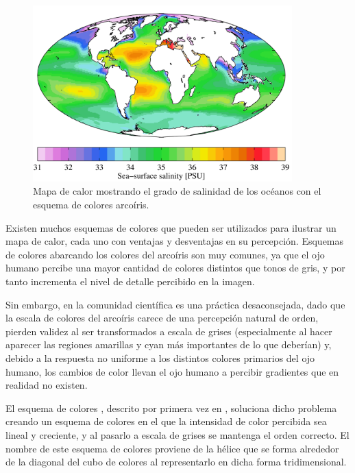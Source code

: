 \begin{figure}[h] \centering
    \includegraphics[width=10cm]{graphs/saltheatmap.png}\caption{Mapa de calor mostrando el grado de salinidad de los océanos con el esquema de colores arcoíris.\cite{wikiheatmap}}\label{fig:saltheatmap}
\end{figure}

    Existen muchos esquemas de colores que pueden ser utilizados para ilustrar un mapa de calor, cada uno con ventajas y desventajas en su percepción. Esquemas de colores abarcando los colores del arcoíris son muy comunes, ya que el ojo humano percibe una mayor cantidad de colores distintos que tonos de gris, y por tanto incrementa el nivel de detalle percibido en la imagen. 
    
    Sin embargo, en la comunidad científica es una práctica desaconsejada, dado que la escala de colores del arcoíris carece de una percepción natural de orden, pierden validez al ser transformados a escala de grises (especialmente al hacer aparecer las regiones amarillas y cyan más importantes de lo que deberían) y, debido a la respuesta no uniforme a los distintos colores primarios del ojo humano, los cambios de color llevan el ojo humano a percibir gradientes que en realidad no existen.

    El esquema de colores , descrito por primera vez en \cite{cubehelix}, soluciona dicho problema creando un esquema de colores en el que la intensidad de color percibida sea lineal y creciente, y al pasarlo a escala de grises se mantenga el orden correcto. El nombre de este esquema de colores proviene de la hélice que se forma alrededor de la diagonal del cubo de colores al representarlo en dicha forma tridimensional.

